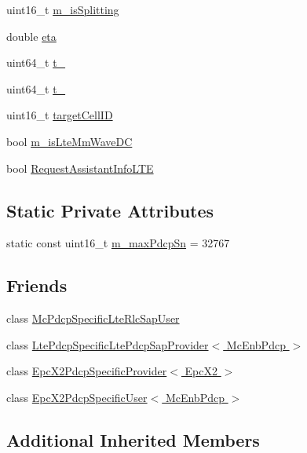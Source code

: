\begin{DoxyCompactItemize}
\item 
uint16\+\_\+t \hyperlink{classns3_1_1McEnbPdcp_a362ac09ce1bb709d298ca2f668caaff1}{m\+\_\+is\+Splitting}
\item 
double \hyperlink{classns3_1_1McEnbPdcp_a9bdb4b1ad41b13a14a050d3ddca0393a}{eta}
\item 
uint64\+\_\+t \hyperlink{classns3_1_1McEnbPdcp_a93ce093c7aefaaf9b51f51ef50435c84}{t\+\_}
\item 
uint64\+\_\+t \hyperlink{classns3_1_1McEnbPdcp_ad2273e371108f936f9086b8fb6d64b57}{t\+\_}
\item 
uint16\+\_\+t \hyperlink{classns3_1_1McEnbPdcp_a3c3eb4a4382244df123362ca72be5063}{target\+Cell\+ID}
\item 
bool \hyperlink{classns3_1_1McEnbPdcp_a84449b23303f48d8e9cd509fd7733bac}{m\+\_\+is\+Lte\+Mm\+Wave\+DC}
\item 
bool \hyperlink{classns3_1_1McEnbPdcp_a4fcba7a81ba20974b60e0d75bb00c4dd}{Request\+Assistant\+Info\+L\+TE}
\end{DoxyCompactItemize}
\subsection*{Static Private Attributes}
\begin{DoxyCompactItemize}
\item 
static const uint16\+\_\+t \hyperlink{classns3_1_1McEnbPdcp_aec518036b2245a6b6abe772f95439cfd}{m\+\_\+max\+Pdcp\+Sn} = 32767
\end{DoxyCompactItemize}
\subsection*{Friends}
\begin{DoxyCompactItemize}
\item 
class \hyperlink{classns3_1_1McEnbPdcp_aa730947a92e2bd2f95e14427cfad8d6e}{Mc\+Pdcp\+Specific\+Lte\+Rlc\+Sap\+User}
\item 
class \hyperlink{classns3_1_1McEnbPdcp_a3be5fad687b68405df05738af9554f02}{Lte\+Pdcp\+Specific\+Lte\+Pdcp\+Sap\+Provider$<$ Mc\+Enb\+Pdcp $>$}
\item 
class \hyperlink{classns3_1_1McEnbPdcp_a372bb6d7b4f9b08802172b6cf02ecd2d}{Epc\+X2\+Pdcp\+Specific\+Provider$<$ Epc\+X2 $>$}
\item 
class \hyperlink{classns3_1_1McEnbPdcp_adb5c9b87eb2b6a798e7cd8d9a898c24a}{Epc\+X2\+Pdcp\+Specific\+User$<$ Mc\+Enb\+Pdcp $>$}
\end{DoxyCompactItemize}
\subsection*{Additional Inherited Members}


